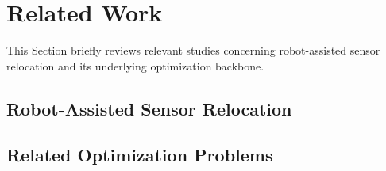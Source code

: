 \documentclass[conference]{IEEEtran}
\begin{document}
\section{Related Work}
\label{sec:RelatedWork}

This Section briefly reviews relevant studies concerning robot-assisted sensor relocation and 
its underlying optimization backbone.

\subsection{Robot-Assisted Sensor Relocation}
\label{sec:RelatedWork:RASR}



\subsection{Related Optimization Problems}
\label{sec:RelatedWork:Optimization}
\end{document}
